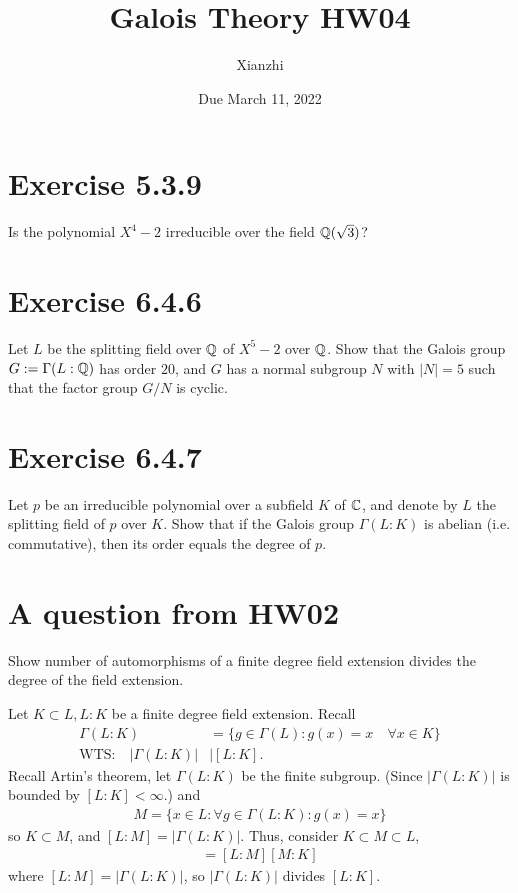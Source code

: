 \documentclass[12pt,english]{article}
\title{Galois Theory HW04}
\author{Xianzhi}
\date{Due March 11, 2022}
\begin{document}
\maketitle

\section*{Exercise 5.3.9}
\begin{question}
    Is the polynomial $X^4 -2$ irreducible over the field $\mathbb{Q}(\sqrt{3})$?
\end{question}

\section*{Exercise 6.4.6}
\begin{question}
    Let $L$ be the splitting field over $\mathbb{Q}$ of $X^5 - 2$ over $\mathbb{Q}$. 
    Show that the Galois group $G:=\Gamma(L:\mathbb{Q})$ has order $20$,
    and $G$ has a normal subgroup $N$ with $\lvert N \rvert = 5$
    such that the factor group $G/N$ is cyclic.
\end{question}

\section*{Exercise 6.4.7}
\begin{question}
    Let $p$ be an irreducible polynomial over a subfield $K$ of $\mathbb{C}$, and denote by $L$ the splitting field of $p$ over $K$. 
    Show that if the Galois group $\Gamma (L:K)$ is abelian (i.e. commutative), 
    then its order equals the degree of $p$.
\end{question}




\section*{A question from HW02}
\begin{question}
Show number of automorphisms of a finite degree field extension divides the degree of the field extension. 
\end{question}
Let $K \subset L, L:K$ be a finite degree field extension. Recall
\begin{align*}
    \Gamma(L:K) &= \{g \in \Gamma(L): g(x) = x \quad \forall x \in K\}\\
    \text{WTS:} \quad |\Gamma(L:K)| &\mid [L:K].
\end{align*} Recall Artin's theorem, let $\Gamma(L:K)$ be the finite subgroup. (Since $|\Gamma(L:K)|$ is bounded by $[L:K]<\infty$.) and 
\begin{align*}
    M = \{x \in L: \forall g \in \Gamma(L:K): g(x)= x\}
\end{align*} so $K \subset M$, and $[L:M]=|\Gamma(L:K)|$. Thus, consider $K \subset M \subset L$,
\begin{align*}
    [L:K] = [L:M][M:K]
\end{align*} where $[L:M] = |\Gamma(L:K)|$, so $|\Gamma(L:K)|$ divides $[L:K]$.
\end{document}
